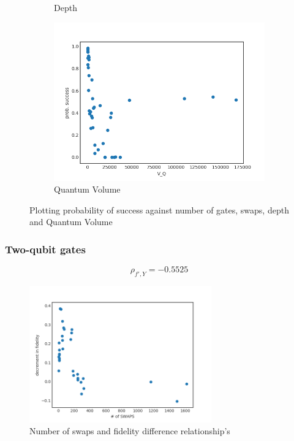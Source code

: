 \documentclass[11pt]{article}
\begin{document}
\begin{figure}[H]
\begin{subfigure}[b]{0.5\linewidth}
    \caption{Depth} 
    \label{fig:ps_d_1000} 
  \end{subfigure}%
  \begin{subfigure}[b]{0.5\linewidth}
    \centering
    \includegraphics[width=0.75\linewidth]{ps_q_1000} 
    \caption{Quantum Volume} 
    \label{fig:ps_q_1000} 
  \end{subfigure} 
  \caption{Plotting probability of success against number of gates, swaps, depth and Quantum Volume}
  \label{fig:ps_1000} 
\end{figure}

\subsubsection{Two-qubit gates}
\label{sec:orgafc89e2}

$$\rho _{f',Y} = -0.5525$$

\begin{figure}[htbp]
\centering
\includegraphics[width=0.7\textwidth]{f_s_2qg_1000.png}
\caption{\label{fig:orgd0dd1eb}
Number of swaps and fidelity difference relationship's}
\end{figure}
\end{document}
